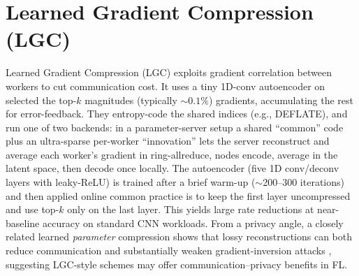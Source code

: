 \section{Learned Gradient Compression (LGC) \cite{Abrahamyan2022LGC}}
Learned Gradient Compression (LGC) \cite{Abrahamyan2022LGC} exploits gradient correlation between workers to cut communication cost. It uses a tiny 1D-conv autoencoder on selected the top-$k$ magnitudes (typically $\sim0.1\%$) gradients, accumulating the rest for error-feedback. They entropy-code the shared indices (e.g., DEFLATE), and run one of two backends:
in a parameter-server setup a shared “common” code plus an ultra-sparse per-worker “innovation” lets the server reconstruct and average each worker’s gradient
in ring-allreduce, nodes encode, average in the latent space, then decode once locally. The autoencoder (five 1D conv/deconv layers with leaky-ReLU) is trained after a brief warm-up ($\sim$200–300 iterations) and then applied online
common practice is to keep the first layer uncompressed and use top-$k$ only on the last layer. This yields large rate reductions at near-baseline accuracy on standard CNN workloads. From a privacy angle, a closely related learned \emph{parameter} compression shows that lossy reconstructions can both reduce communication and substantially weaken gradient-inversion attacks \cite{Chen2024ParamCompression}, suggesting LGC-style schemes may offer communication–privacy benefits in FL.
